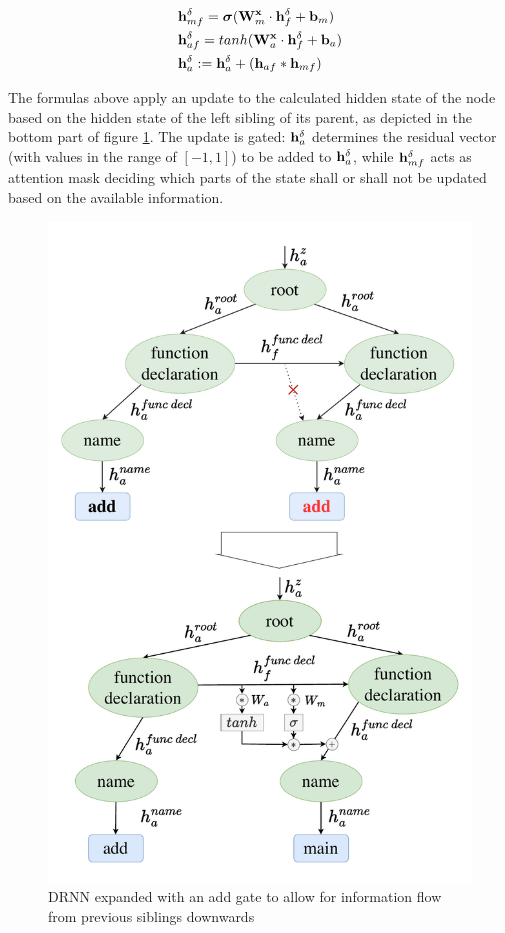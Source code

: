 \begin{align}
    &\mathbf{h}_{mf}^\delta = \boldsymbol\sigma(\mathbf{W}^{\mathbf{x}}_m \cdot \mathbf{h}_f^\delta + \mathbf{b}_m)\\
    &\mathbf{h}_{af}^\delta = tanh(\mathbf{W}^{\mathbf{x}}_a \cdot \mathbf{h}_f^\delta + \mathbf{b}_a)\\
    &\mathbf{h}_a^\delta := \mathbf{h}_a^\delta + (\mathbf{h}_{af} * \mathbf{h}_{mf})
\end{align}

The formulas above apply an update to the calculated hidden state of the node based on the hidden state of the left sibling of its parent, as depicted in the bottom part of figure \ref{fig:treeAddGate}. The update is gated: $\mathbf{h}_a^\delta$ determines the residual vector (with values in the range of $[-1,1]$) to be added to $\mathbf{h}_a^\delta$, while $\mathbf{h}_{mf}^\delta$ acts as attention mask deciding which parts of the state shall or shall not be updated based on the available information.


\begin{figure}
    \centering
    \includegraphics[width=\linewidth]{images/TreeAddGate.pdf}
    \caption{DRNN expanded with an add gate to allow for information flow from previous siblings downwards}
    \label{fig:treeAddGate}
\end{figure}

